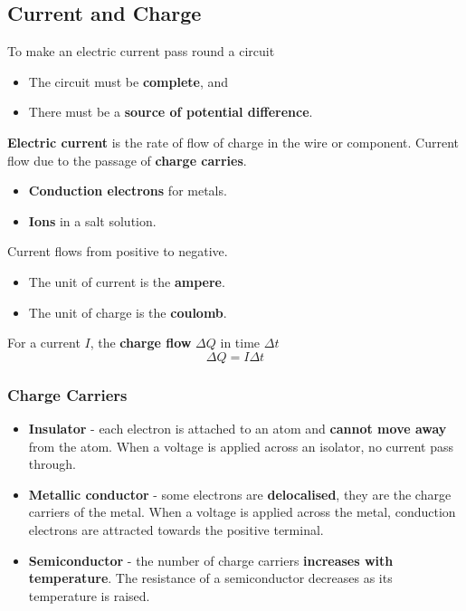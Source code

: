 \subsection{Current and Charge}

To make an electric current pass round a circuit
\begin{itemize}
    \item The circuit must be \textbf{complete}, and
    \item There must be a \textbf{source of potential difference}.
\end{itemize}

\textbf{Electric current} is the rate of flow of charge in the wire or component. Current flow due to the passage of \textbf{charge carries}.
\begin{itemize}
    \item \textbf{Conduction electrons} for metals.
    \item \textbf{Ions} in a salt solution.
\end{itemize}

Current flows from positive to negative.

\begin{itemize}
    \item The unit of current is the \textbf{ampere}.
    \item The unit of charge is the \textbf{coulomb}.
\end{itemize}

For a current $I$, the \textbf{charge flow} $\Delta Q$ in time $\Delta t$
$$\Delta Q=I\Delta t$$

\subsubsection*{Charge Carriers}

\begin{itemize}
    \item \textbf{Insulator} - each electron is attached to an atom and \textbf{cannot move away} from the atom. When a voltage is applied across an isolator, no current pass through.
    \item \textbf{Metallic conductor} - some electrons are \textbf{delocalised}, they are the charge carriers of the metal. When a voltage is applied across the metal, conduction electrons are attracted towards the positive terminal.
    \item \textbf{Semiconductor} - the number of charge carriers \textbf{increases with temperature}. The resistance of a semiconductor decreases as its temperature is raised. 
\end{itemize}
